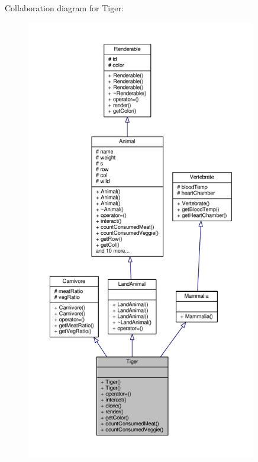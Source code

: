 Collaboration diagram for Tiger\+:
\nopagebreak
\begin{figure}[H]
\begin{center}
\leavevmode
\includegraphics[height=550pt]{classTiger__coll__graph}
\end{center}
\end{figure}
